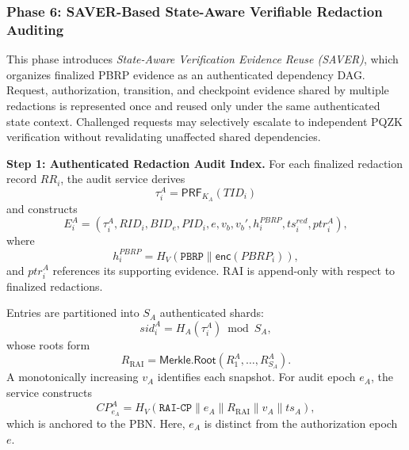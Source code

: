 \documentclass[lettersize,journal]{IEEEtran}
\begin{document}
\subsubsection*{\textbf{Phase 6: SAVER-Based State-Aware
Verifiable Redaction Auditing}}

This phase introduces \emph{State-Aware Verification Evidence Reuse
(SAVER)}, which organizes finalized PBRP evidence as an authenticated
dependency DAG. Request, authorization, transition, and checkpoint
evidence shared by multiple redactions is represented once and reused
only under the same authenticated state context. Challenged requests
may selectively escalate to independent PQZK verification without
revalidating unaffected shared dependencies.

\medskip
\noindent\textbf{Step 1: Authenticated Redaction Audit Index.}
For each finalized redaction record $RR_i$, the audit service derives
\begin{equation}
\tau_i^A=\mathsf{PRF}_{K_A}(TID_i)
\end{equation}
and constructs
\begin{equation}
E_i^A=
(\tau_i^A,RID_i,BID_e,PID_i,e,v_b,v_b',
h_i^{PBRP},ts_i^{red},ptr_i^A),
\end{equation}
where
\begin{equation}
h_i^{PBRP}
=
H_V(\texttt{PBRP}\parallel\mathsf{enc}(PBRP_i)),
\end{equation}
and $ptr_i^A$ references its supporting evidence. RAI is append-only
with respect to finalized redactions.

Entries are partitioned into $S_A$ authenticated shards:
\begin{equation}
sid_i^A=H_A(\tau_i^A)\bmod S_A,
\end{equation}
whose roots form
\begin{equation}
R_{\mathrm{RAI}}
=
\mathsf{Merkle.Root}(R_1^A,\ldots,R_{S_A}^A).
\end{equation}
A monotonically increasing $v_A$ identifies each snapshot. For audit
epoch $e_A$, the service constructs
\begin{equation}
CP_{e_A}^A
=
H_V(
\texttt{RAI-CP}\parallel e_A\parallel
R_{\mathrm{RAI}}\parallel v_A\parallel ts_A),
\end{equation}
which is anchored to the PBN. Here, $e_A$ is distinct from the
authorization epoch $e$.
\end{document}
